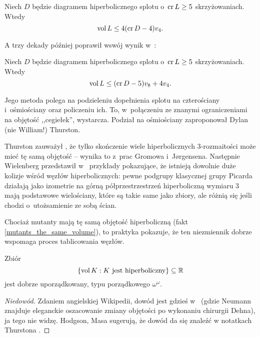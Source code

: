 \begin{proposition}
    Niech $D$ będzie diagramem hiperbolicznego splotu o~$\operatorname{cr} L \ge 5$ skrzyżowaniach.
    Wtedy
    \begin{equation}
        \operatorname{vol} L \le 4 (\operatorname{cr} D - 4) v_4.
    \end{equation}
\end{proposition}

A trzy dekady później poprawił wswój wynik w~\cite{adams13}:

\begin{proposition}
    Niech $D$ będzie diagramem hiperbolicznego splotu o~$\operatorname{cr} L \ge 5$ skrzyżowaniach.
    Wtedy
    \begin{equation}
        \operatorname{vol} L \le (\operatorname{cr} D - 5) v_8 + 4v_4.
    \end{equation}
\end{proposition}

Jego metoda polega na podzieleniu dopełnienia splotu na czterościany i~ośmiościany oraz policzeniu ich.
To, w~połączeniu ze znanymi ograniczeniami na objętość ,,cegiełek'', wystarcza.
Podział na ośmiościany zaproponował Dylan (nie William!) Thurston.

Thurston zauważył \cite[s. 365]{thurston82}, że tylko skończenie wiele hiperbolicznych 3-rozmaitości może mieć tę samą objętość -- wynika to z~prac Gromowa i~Jørgensena.
Następnie Wielenberg przedstawił w~\cite{wielenberg81} przykłady pokazujące, że istnieją dowolnie duże kolizje wśród węzłów hiperbolicznych: pewne podgrupy klasycznej grupy Picarda działają jako izometrie na górną półprzestrzestrzeń hiperboliczną wymiaru 3 mają podstawowe wielościany, które są takie same jako zbiory, ale różnią się jeśli chodzi o~utożsamienie ze sobą ścian.

Chociaż mutanty mają tę samą objętość hiperboliczną (fakt \ref{mutants_the_same_volume}), to praktyka pokazuje, że ten niezmiennik dobrze wspomaga proces tablicowania węzłów.

\begin{proposition}
    Zbiór
    \[
        \{\operatorname{vol} K: K \textrm{ jest hiperboliczny}\} \subseteq \mathbb R
    \]
    jest dobrze uporządkowany, typu porządkowego $\omega^\omega$.
\end{proposition}

\begin{proof}[Niedowód]
    Zdaniem angielskiej Wikipedii, dowód jest gdzieś w~\cite{neumann85} (gdzie Neumann znajduje eleganckie oszacowanie zmiany objętości po wykonaniu chirurgii Dehna), ja tego nie widzę.
    Hodgson, Masa \cite{hodgson13} sugerują, że dowód da się znaleźć w notatkach Thurstona \cite{thurston02}.
\end{proof}

